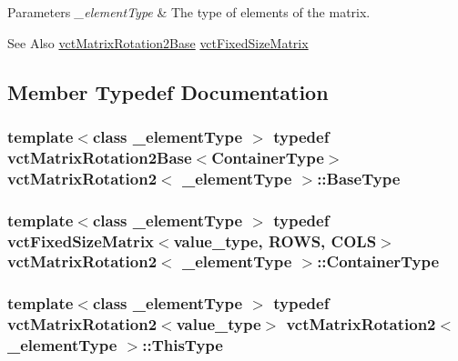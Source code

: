 \begin{DoxyParams}{Parameters}
{\em \-\_\-element\-Type} & The type of elements of the matrix.\\
\hline
\end{DoxyParams}
\begin{DoxySeeAlso}{See Also}
\hyperlink{classvct_matrix_rotation2_base}{vct\-Matrix\-Rotation2\-Base} \hyperlink{classvct_fixed_size_matrix}{vct\-Fixed\-Size\-Matrix} 
\end{DoxySeeAlso}


\subsection{Member Typedef Documentation}
\hypertarget{classvct_matrix_rotation2_a6d9fad3de3e445606a22bf1a3e9da631}{
\subsubsection[{Base\-Type}]{\setlength{\rightskip}{0pt plus 5cm}template$<$class \-\_\-element\-Type $>$ typedef {\bf vct\-Matrix\-Rotation2\-Base}$<${\bf Container\-Type}$>$ {\bf vct\-Matrix\-Rotation2}$<$ \-\_\-element\-Type $>$\-::{\bf Base\-Type}}}\label{classvct_matrix_rotation2_a6d9fad3de3e445606a22bf1a3e9da631}
\hypertarget{classvct_matrix_rotation2_ab84e040499a56ef9c8ab6b3a57e09479}{
\subsubsection[{Container\-Type}]{\setlength{\rightskip}{0pt plus 5cm}template$<$class \-\_\-element\-Type $>$ typedef {\bf vct\-Fixed\-Size\-Matrix}$<$value\-\_\-type, {\bf R\-O\-W\-S}, {\bf C\-O\-L\-S}$>$ {\bf vct\-Matrix\-Rotation2}$<$ \-\_\-element\-Type $>$\-::{\bf Container\-Type}}}\label{classvct_matrix_rotation2_ab84e040499a56ef9c8ab6b3a57e09479}
\hypertarget{classvct_matrix_rotation2_a5129223265a26c20222068fee4733dd1}{
\subsubsection[{This\-Type}]{\setlength{\rightskip}{0pt plus 5cm}template$<$class \-\_\-element\-Type $>$ typedef {\bf vct\-Matrix\-Rotation2}$<$value\-\_\-type$>$ {\bf vct\-Matrix\-Rotation2}$<$ \-\_\-element\-Type $>$\-::{\bf This\-Type}}}\label{classvct_matrix_rotation2_a5129223265a26c20222068fee4733dd1}
